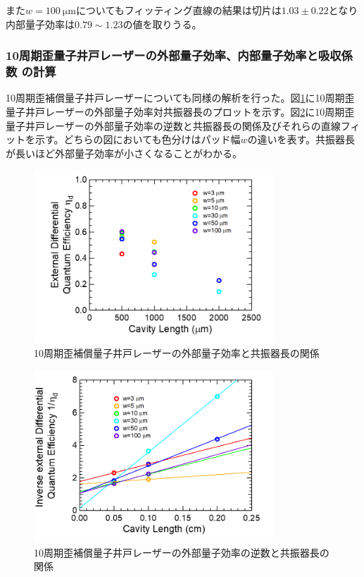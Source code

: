 {{また$w=100 \ \si{\micro\metre}$についてもフィッティング直線の結果は切片は$1.03 \pm 0.22$となり内部量子効率は$0.79\sim1.23$の値を取りうる。

\subsubsection{10周期歪量子井戸レーザーの外部量子効率、内部量子効率と吸収係数
の計算}
10周期歪補償量子井戸レーザーについても同様の解析を行った。図\ref{fig:fig_3_1_10QW_broadcontact_id_02}に10周期歪量子井戸レーザーの外部量子効率対共振器長のプロットを示す。図\ref{fig:fig_3_1_10QW_broadcontact_id_inverse_02}に10周期歪量子井戸レーザーの外部量子効率の逆数と共振器長の関係及びそれらの直線フィットを示す。どちらの図においても色分けはパッド幅$w$の違いを表す。共振器長が長いほど外部量子効率が小さくなることがわかる。
\begin{figure}[h]
	\centering
	\includegraphics[width=9cm]{figure/fig_3_1_10QW_broadcontact_id_02.png}
	\caption{10周期歪補償量子井戸レーザーの外部量子効率と共振器長の関係}
	\label{fig:fig_3_1_10QW_broadcontact_id_02}
\end{figure}

\begin{figure}[h]
	\centering
	\includegraphics[width=9cm]{figure/fig_3_1_10QW_broadcontact_id_inverse_02.png}
	\caption{10周期歪補償量子井戸レーザーの外部量子効率の逆数と共振器長の関係}
	\label{fig:fig_3_1_10QW_broadcontact_id_inverse_02}
\end{figure}

}}
